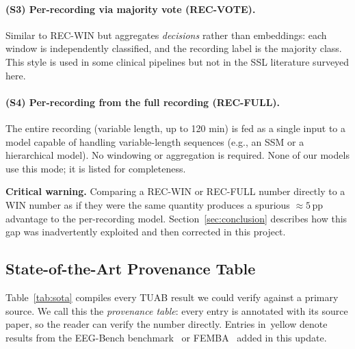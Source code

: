 \documentclass[11pt,a4paper]{article}
\begin{document}
\paragraph{(S3) Per-recording via majority vote (REC-VOTE).}
Similar to REC-WIN but aggregates \emph{decisions} rather than embeddings:
each window is independently classified, and the recording label is the
majority class.  This style is used in some clinical pipelines but not in the
SSL literature surveyed here.

\paragraph{(S4) Per-recording from the full recording (REC-FULL).}
The entire recording (variable length, up to 120 min) is fed as a single
input to a model capable of handling variable-length sequences (e.g., an SSM
or a hierarchical model).  No windowing or aggregation is required.
None of our models use this mode; it is listed for completeness.

\medskip
\noindent\textbf{Critical warning.}
Comparing a REC-WIN or REC-FULL number directly to a WIN number as if they
were the same quantity produces a spurious ${\approx}5$\,pp advantage to the
per-recording model.  Section~\ref{sec:conclusion} describes how this gap was
inadvertently exploited and then corrected in this project.

\subsection{State-of-the-Art Provenance Table}
\label{sec:sota_table}

Table~\ref{tab:sota} compiles every TUAB result we could verify against a
primary source.  We call this the \emph{provenance table}: every entry is
annotated with its source paper, so the reader can verify the number directly.
Entries in~\colorbox{sota}{yellow} denote results from the EEG-Bench
benchmark~\cite{eeg_bench} or FEMBA~\cite{femba} added in this update.
\end{document}
